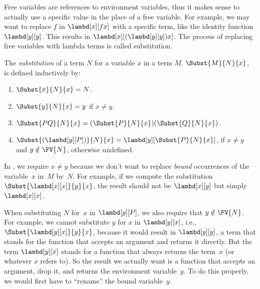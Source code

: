 \documentclass[../../../include/open-logic-section]{subfiles}
\begin{document}

\begin{explain}
Free variables are references to environment variables, thus it makes
sense to actually use a specific value in the place of a free
variable. For example, we may want to replace $f$ in $\lambd[x][f x]$
with a specific term, like the identity function $\lambd[y][y]$. This
results in $\lambd[x][(\lambd[y][y]) x]$. The process of replacing
free variables with lambda terms is called substitution.
\end{explain}

\begin{defn}[Substitution] 
  The \emph{substitution} of a term $N$ for a variable $x$ in a term
  $M$, $\Subst{M}{N}{x}$, is defined inductively by:
  \begin{enumerate}
    \item $\Subst{x}{N}{x} = N$.  
    \item $\Subst{y}{N}{x}  = y$ if $x \neq y$.  
    \item $\Subst{PQ}{N}{x}  = (\Subst{P}{N}{x}) (\Subst{Q}{N}{x})$.
    \item $\Subst{(\lambd[y][P])}{N}{x} = \lambd[y][\Subst{P}{N}{x}]$,
      if $x \neq y$ and $y \notin \FV{N}$, otherwise undefined.
  \end{enumerate}
\end{defn}

\begin{explain}
In , we require $x
\neq y$ because we don't want to replace \emph{bound} occurrences of
the variable~$x$ in~$M$ by~$N$.  For example, if we compute the
substitution $\Subst{\lambd[x][x]}{y}{x}$, the result should not be
$\lambd[x][y]$ but simply $\lambd[x][x]$.

When substituting $N$ for~$x$ in $\lambd[y][P]$, we also require that
$y \notin \FV{N}$.  For example, we cannot substitute $y$ for $x$ in
$\lambd[y][x]$, i.e., $\Subst{\lambd[y][x]}{y}{x}$, because it would
result in $\lambd[y][y]$, a term that stands for the function that
accepts an argument and returns it directly. But the term
$\lambd[y][x]$ stands for a function that always returns the term~$x$
(or whatever $x$ refers to). So the result we actually want is a
function that accepts an argument, drop it, and returns the
environment variable~$y$. To do this properly, we would first have to
``rename'' the bound variable~$y$.
\end{explain}
\end{document}
